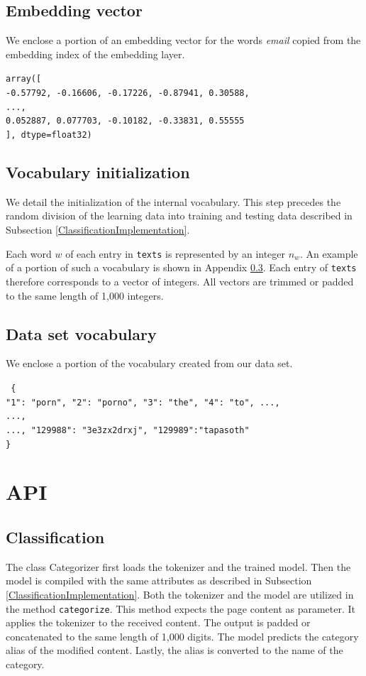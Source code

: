 \subsection{Embedding vector} \label{dix_embeddingVector}
We enclose a portion of an embedding vector for the words \textit{email} copied from the embedding index of the embedding layer.

\texttt{array([\\
 -0.57792, -0.16606, -0.17226, -0.87941,  0.30588,\\
...,\\
  0.052887, 0.077703, -0.10182, -0.33831, 0.55555\\
], dtype=float32)}

\subsection{Vocabulary initialization}
We detail the initialization of the internal vocabulary. This step precedes the random division of the learning data into training and testing data described in Subsection \ref{ClassificationImplementation}. 

Each word $w$ of each entry in \texttt{texts} is represented by an integer $n_w$. An example of a portion of such a vocabulary is shown in Appendix \ref{DSvocabulary}. Each entry of \texttt{texts} therefore corresponds to a vector of integers. All vectors are trimmed or padded to the same length of 1,000 integers. 
\subsection{Data set vocabulary} \label{DSvocabulary}
We enclose a portion of the vocabulary created from our data set.

\texttt{
\{\\
\text{    }"1": "porn", "2": "porno", "3": "the", "4": "to", ...,\\
    ...,\\
    ..., "129988": "3e3zx2drxj", "129989":"tapasoth"\\
\}}

\section{API}
\subsection{Classification} \label{dixApClassification}
The class Categorizer first loads the tokenizer and the trained model. Then the model is compiled with the same attributes as described in Subsection \ref{ClassificationImplementation}. Both the tokenizer and the model are utilized in the method \texttt{categorize}. This method expects the page content as parameter. It applies the tokenizer to the received content. The output is padded or concatenated to the same length of 1,000 digits. The model predicts the category alias of the modified content. Lastly, the alias is converted to the name of the category.
\FloatBarrier 
